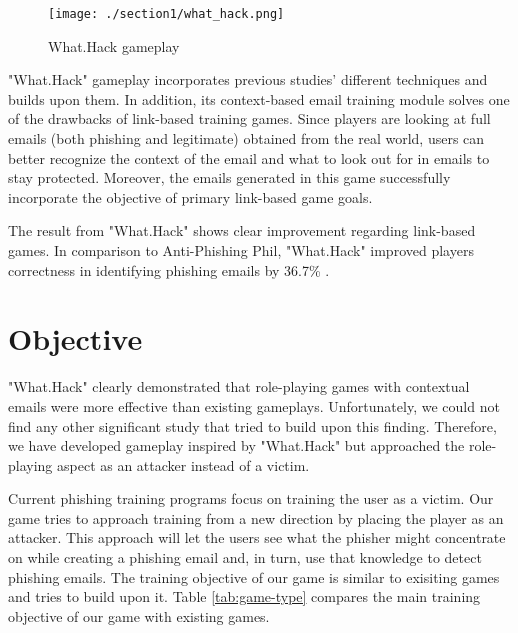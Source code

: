 \begin{figure}[h]
    \centering
    \texttt{[image: ./section1/what\_hack.png]}
    \caption{What.Hack gameplay}
\end{figure}

"What.Hack" gameplay incorporates previous studies' different techniques and builds upon them. In addition, its context-based email training module solves one of the drawbacks of link-based training games. Since players are looking at full emails (both phishing and legitimate) obtained from the real world, users can better recognize the context of the email and what to look out for in emails to stay protected. Moreover, the emails generated in this game successfully incorporate the objective of primary link-based game goals.

The result from "What.Hack" shows clear improvement regarding link-based games. In comparison to Anti-Phishing Phil, "What.Hack" improved players correctness in identifying phishing emails by 36.7\% \cite{what_hack}.

\section{Objective}

"What.Hack" clearly demonstrated that role-playing games with contextual emails were more effective than existing gameplays. Unfortunately, we could not find any other significant study that tried to build upon this finding. Therefore, we have developed gameplay inspired by "What.Hack" but approached the role-playing aspect as an attacker instead of a victim.

Current phishing training programs focus on training the user as a victim. Our game tries to approach training from a new direction by placing the player as an attacker. This approach will let the users see what the phisher might concentrate on while creating a phishing email and, in turn, use that knowledge to detect phishing emails. The training objective of our game is similar to exisiting games and tries to build upon it. Table \ref{tab:game-type} compares the main training objective of our game with existing games.

